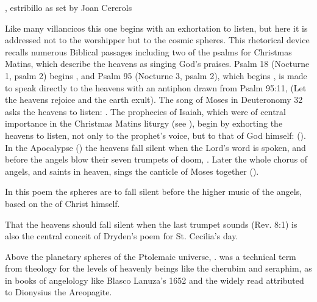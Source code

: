 \begin{poemexample}
    \caption{, estribillo as set by Joan Cererols}
    \label{poem:Suspended_cielos-estribillo}
\end{poemexample}

Like many villancicos this one begins with an exhortation to listen, but here it
is addressed not to the worshipper but to the cosmic spheres. 
This rhetorical device recalls numerous Biblical passages including two of the
psalms for Christmas Matins, which describe the heavens as singing God's
praises.
Psalm 18 (Nocturne 1, psalm 2) begins , and Psalm 95 (Nocturne 3, psalm 2), which begins , is made to speak directly to the heavens
with an antiphon drawn from Psalm 95:11,  (Let the heavens rejoice and the earth exult).%
    \Autocite[169--179]{Catholic:Breviarium1631}
The song of Moses in Deuteronomy 32 asks the heavens to listen: . 
The prophecies of Isaiah, which were of central importance in the Christmas
Matins liturgy (see ), begin by exhorting the heavens to
listen, not only to the prophet's voice, but to that of God himself:
 ().
In the Apocalypse () the heavens fall silent when the
Lord's word is spoken, and before the angels blow their seven trumpets of
doom, .
Later the whole chorus of angels,  and saints in
heaven, sings the canticle of Moses together ().


In this poem the spheres are to fall silent before the higher music of the
angels, based on the  of Christ himself.%
\begin{Footnote}
    That the heavens should fall silent when the last trumpet sounds (Rev. 8:1)
    is also the central conceit of Dryden's poem for St. Cecilia's day. 
\end{Footnote}
Above the planetary spheres of the Ptolemaic universe, . 
 was a technical term from theology for the levels of
heavenly beings like the cherubim and seraphim, as in books of angelology like
Blasco Lanuza's 1652  and
the widely read  attributed to Dionysius the
Areopagite.%
    \Autocite[See also][, 393]{Kircher:Musurgia}

